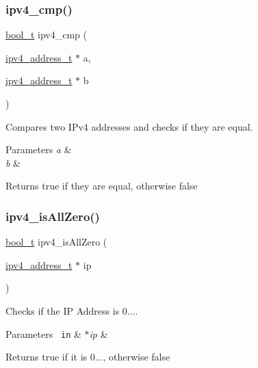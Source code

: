\subsubsection{\texorpdfstring{ipv4\_cmp()}{ipv4\_cmp()}}
{\footnotesize\ttfamily \mbox{\hyperlink{bool_8h_a449976458a084f880dc8e3d29e7eb6f5}{bool\+\_\+t}} ipv4\+\_\+cmp (\begin{DoxyParamCaption}\item[{\mbox{\hyperlink{group__ipv4_gad9df0882950e70d0587a4b423beb261a}{ipv4\+\_\+address\+\_\+t}} $\ast$}]{a,  }\item[{\mbox{\hyperlink{group__ipv4_gad9df0882950e70d0587a4b423beb261a}{ipv4\+\_\+address\+\_\+t}} $\ast$}]{b }\end{DoxyParamCaption})}



Compares two I\+Pv4 addresses and checks if they are equal. 


\begin{DoxyParams}{Parameters}
{\em a} & \\
\hline
{\em b} & \\
\hline
\end{DoxyParams}
\begin{DoxyReturn}{Returns}
true if they are equal, otherwise false 
\end{DoxyReturn}
\mbox{\label{group__ip__operations_gaa00ec29f5a104d77f8f61f47da1fa9b6}} 
\subsubsection{\texorpdfstring{ipv4\_isAllZero()}{ipv4\_isAllZero()}}
{\footnotesize\ttfamily \mbox{\hyperlink{bool_8h_a449976458a084f880dc8e3d29e7eb6f5}{bool\+\_\+t}} ipv4\+\_\+is\+All\+Zero (\begin{DoxyParamCaption}\item[{\mbox{\hyperlink{group__ipv4_gad9df0882950e70d0587a4b423beb261a}{ipv4\+\_\+address\+\_\+t}} $\ast$}]{ip }\end{DoxyParamCaption})}



Checks if the IP Address is 0.... 


\begin{DoxyParams}[1]{Parameters}
\mbox{\texttt{ in}}  & {\em $\ast$ip} & \\
\hline
\end{DoxyParams}
\begin{DoxyReturn}{Returns}
true if it is 0..., otherwise false 
\end{DoxyReturn}
\mbox{\label{group__ip__operations_gac5383f68f84a2968218c92812354512a}} 
